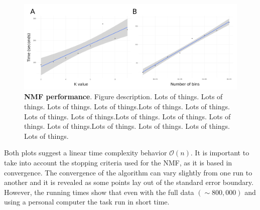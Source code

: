 \begin{figure}[h]
    \centering
    \includegraphics[width=\textwidth]{Figures/performance/performance_nmf_join.png}
    \caption[NMF performance]{\textbf{NMF performance}. Figure description. Lots of things. Lots of things. Lots of things. Lots of things.Lots of things. Lots of things. Lots of things. Lots of things.Lots of things. Lots of things. Lots of things. Lots of things.Lots of things. Lots of things. Lots of things. Lots of things.}
    \label{fig:NMF}
\end{figure}

\medskip

Both plots suggest a linear time complexity behavior \(\mathcal{O}(n)\). It is important to take into account the stopping criteria used for the NMF, as it is based in convergence. The convergence of the algorithm can vary slightly from one run to another and it is revealed as some points lay out of the standard error boundary. However, the running times show that even with the full data \((\sim800,000)\) and using a personal computer the task run in short time.
